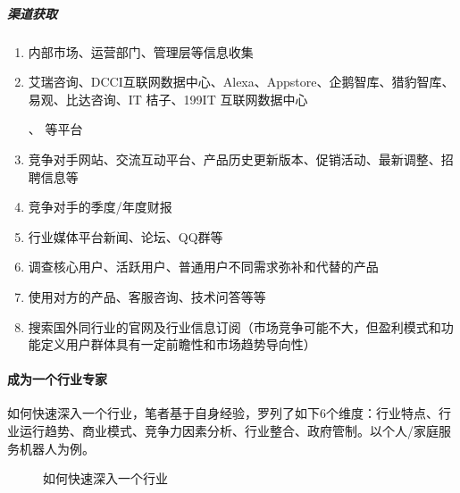 \documentclass[letterpaper,11pt,english]{sphinxmanual}
\begin{document}
\subparagraph{渠道获取}
\label{\detokenize{chapter_knowledge/industry_analysis:id19}}\begin{enumerate}
%
\item {} 
内部市场、运营部门、管理层等信息收集

\item {} 
艾瑞咨询、DCCI互联网数据中心、Alexa、Appstore、企鹅智库、猎豹智库、易观、比达咨询、IT
桔子、199IT
互联网数据中心%
\begin{footnote}[437]\sphinxAtStartFootnote
{}
%
\end{footnote}、
等平台 %
\begin{footnote}[438]\sphinxAtStartFootnote
{}
%
\end{footnote}

\item {} 
竞争对手网站、交流互动平台、产品历史更新版本、促销活动、最新调整、招聘信息等

\item {} 
竞争对手的季度/年度财报

\item {} 
行业媒体平台新闻、论坛、QQ群等

\item {} 
调查核心用户、活跃用户、普通用户不同需求弥补和代替的产品

\item {} 
使用对方的产品、客服咨询、技术问答等等

\item {} 
搜索国外同行业的官网及行业信息订阅（市场竞争可能不大，但盈利模式和功能定义用户群体具有一定前瞻性和市场趋势导向性）

\end{enumerate}


\paragraph{成为一个行业专家}
\label{\detokenize{chapter_knowledge/industry_analysis:id20}}
如何快速深入一个行业，笔者基于自身经验，罗列了如下6个维度：行业特点、行业运行趋势、商业模式、竞争力因素分析、行业整合、政府管制。以个人/家庭服务机器人为例。

\begin{figure}[H]
\centering
\capstart

\noindent{}
\caption{如何快速深入一个行业}\label{\detokenize{chapter_knowledge/industry_analysis:id30}}\end{figure}
\end{document}
